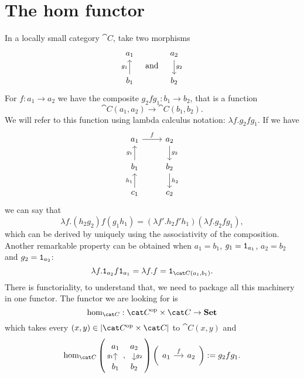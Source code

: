 
\section{The hom functor}

In a locally small 
category \(\cat C\), take two morphisms
\[\begin{tikzcd}
    a_1 \\
    b_1 \ar["g_1", u]
  \end{tikzcd} \quad\text{and}\quad \begin{tikzcd}
    a_2 \ar["g_2", d] \\
    b_2
  \end{tikzcd}\] For \(f : a_1 \to a_2\) we have the composite
\(g_2 f g_1 : b_1 \to b_2\), that is a function
\[\cat C (a_1, a_2) \to \cat C (b_1, b_2) .\]
We will refer to this function using lambda calculus notation:
\(\lambda f . g_2 f g_1\). If we have
\[\begin{tikzcd}%
    a_1 \ar["f", r] & a_2 \ar["g_2", d] \\
    b_1 \ar["g_1", u] & b_2 \ar["h_2", d] \\
    c_1 \ar["h_1", u] & c_2
  \end{tikzcd}\] we can say that
\[\lambda f . (h_2 g_2) f (g_1 h_1) = (\lambda f' . h_2 f' h_1) (\lambda f . g_2 f g_1)
  ,\] which can be derived by uniquely using the associativity of the
composition. Another remarkable property can be obtained when
\(a_1 = b_1\), \(g_1 = \mathtt 1_{a_1}\), \(a_2 = b_2\) and
\(g_2 = \mathtt 1_{a_2}\):
\[\lambda f . \id_{a_2} f \id_{a_1} = \lambda f . f = \id_{\cat C (a_1, b_1)} .\]
There is functoriality, to understand that, we need to package all
this machinery in one functor. The functor we are looking for is
\[\hom_{\cat C} : \opcat C \times \cat C \to \Set\]
which takes every \((x, y) \in \obj{\opcat C \times \cat C}\) to
\(\cat C (x, y)\) and
\[\hom_{\cat C} \left(\begin{tikzcd}[row sep=small] a_1 \\ b_1
      \ar["g_1", u] \end{tikzcd}, \begin{tikzcd}[row sep=small] a_2
      \ar["g_2", d] \\ b_2 \end{tikzcd}\right)
  \left(\begin{tikzcd}[column sep=small] a_1 \ar["f", r] &
      a_2 \end{tikzcd}\right) := g_2 f g_1 .\]


